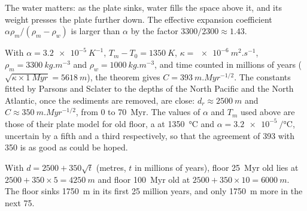 The water matters: as the plate sinks, water fills the space above it, and its
weight presses the plate further down. The effective expansion coefficient
$\alpha\rho_m/(\rho_m - \rho_w)$ is larger than $\alpha$ by the factor
$3300/2300 \approx 1.43$.

With $\alpha = \qty{3.2e-5}{K^{-1}}$, $T_m - T_0 = \qty{1350}{K}$,
$\kappa = \qty{e-6}{m^2.s^{-1}}$, $\rho_m = \qty{3300}{kg.m^{-3}}$ and
$\rho_w = \qty{1000}{kg.m^{-3}}$, and time counted in millions of years
($\sqrt{\kappa\times\qty{1}{Myr}} = \qty{5618}{m}$), the theorem gives
$C = \qty{393}{m.Myr^{-1/2}}$. The constants fitted by Parsons and Sclater to
the depths of the North Pacific and the North Atlantic, once the sediments are
removed, are close: $d_r \approx \qty{2500}{m}$ and
$C \approx \qty{350}{m.Myr^{-1/2}}$, from 0 to \qty{70}{Myr}. The values of
$\alpha$ and $T_m$ used above are those of their plate model for old floor,
a  at \qty{1350}{\degreeCelsius} and
$\alpha = \qty{3.2e-5}{\per\degreeCelsius}$, uncertain by a fifth and a third
respectively, so that the agreement of 393 with 350 is as good as could be
hoped.

\begin{example}\label{ex:b1:rifts-ridges-margins:depths}
With $d = 2500 + 350\sqrt t$ (metres, $t$ in millions of years), floor
\qty{25}{Myr} old lies at $2500 + 350\times5 = \qty{4250}{m}$ and floor
\qty{100}{Myr} old at $2500 + 350\times10 = \qty{6000}{m}$. The floor sinks
\qty{1750}{m} in its first 25 million years, and only \qty{1750}{m} more in
the next 75.
\end{example}

